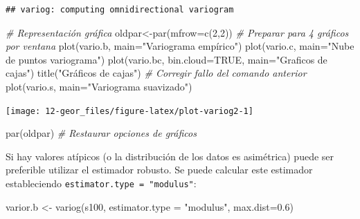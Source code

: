 \documentclass[
  spanish,
]{book}
\newenvironment{Shaded}{\begin{snugshade}}{\end{snugshade}}
\newcommand{\AttributeTok}[1]{\textcolor[rgb]{0.77,0.63,0.00}{#1}}
\newcommand{\CommentTok}[1]{\textcolor[rgb]{0.56,0.35,0.01}{\textit{#1}}}
\newcommand{\ConstantTok}[1]{\textcolor[rgb]{0.00,0.00,0.00}{#1}}
\newcommand{\DecValTok}[1]{\textcolor[rgb]{0.00,0.00,0.81}{#1}}
\newcommand{\FloatTok}[1]{\textcolor[rgb]{0.00,0.00,0.81}{#1}}
\newcommand{\FunctionTok}[1]{\textcolor[rgb]{0.00,0.00,0.00}{#1}}
\newcommand{\NormalTok}[1]{#1}
\newcommand{\OtherTok}[1]{\textcolor[rgb]{0.56,0.35,0.01}{#1}}
\newcommand{\StringTok}[1]{\textcolor[rgb]{0.31,0.60,0.02}{#1}}
\theoremstyle{break}
\theoremstyle{definition}
\theoremstyle{definition}
\theoremstyle{definition}
\theoremstyle{definition}
\theoremstyle{remark}
\begin{document}
\begin{verbatim}
## variog: computing omnidirectional variogram
\end{verbatim}

\begin{Shaded}
\begin{Highlighting}[]
\CommentTok{\# Representación gráfica}
\NormalTok{oldpar}\OtherTok{\textless{}{-}}\FunctionTok{par}\NormalTok{(}\AttributeTok{mfrow=}\FunctionTok{c}\NormalTok{(}\DecValTok{2}\NormalTok{,}\DecValTok{2}\NormalTok{)) }\CommentTok{\# Preparar para 4 gráficos por ventana}
\FunctionTok{plot}\NormalTok{(vario.b, }\AttributeTok{main=}\StringTok{"Variograma empírico"}\NormalTok{)}
\FunctionTok{plot}\NormalTok{(vario.c, }\AttributeTok{main=}\StringTok{"Nube de puntos variograma"}\NormalTok{)}
\FunctionTok{plot}\NormalTok{(vario.bc, }\AttributeTok{bin.cloud=}\ConstantTok{TRUE}\NormalTok{, }\AttributeTok{main=}\StringTok{"Graficos de cajas"}\NormalTok{)}
\FunctionTok{title}\NormalTok{(}\StringTok{"Gráficos de cajas"}\NormalTok{) }\CommentTok{\# Corregir fallo del comando anterior}
\FunctionTok{plot}\NormalTok{(vario.s, }\AttributeTok{main=}\StringTok{"Variograma suavizado"}\NormalTok{)}
\end{Highlighting}
\end{Shaded}

\begin{center}\texttt{[image: 12-geor\_files/figure-latex/plot-variog2-1]} \end{center}

\begin{Shaded}
\begin{Highlighting}[]
\FunctionTok{par}\NormalTok{(oldpar) }\CommentTok{\# Restaurar opciones de gráficos}
\end{Highlighting}
\end{Shaded}

Si hay valores atípicos (o la distribución de los datos es asimétrica)
puede ser preferible utilizar el estimador robusto. Se puede
calcular este estimador estableciendo \texttt{estimator.type\ =\ "modulus"}:

\begin{Shaded}
\begin{Highlighting}[]
\NormalTok{varior.b }\OtherTok{\textless{}{-}} \FunctionTok{variog}\NormalTok{(s100, }\AttributeTok{estimator.type =} \StringTok{"modulus"}\NormalTok{, }\AttributeTok{max.dist=}\FloatTok{0.6}\NormalTok{)}
\end{Highlighting}
\end{Shaded}
\end{document}
